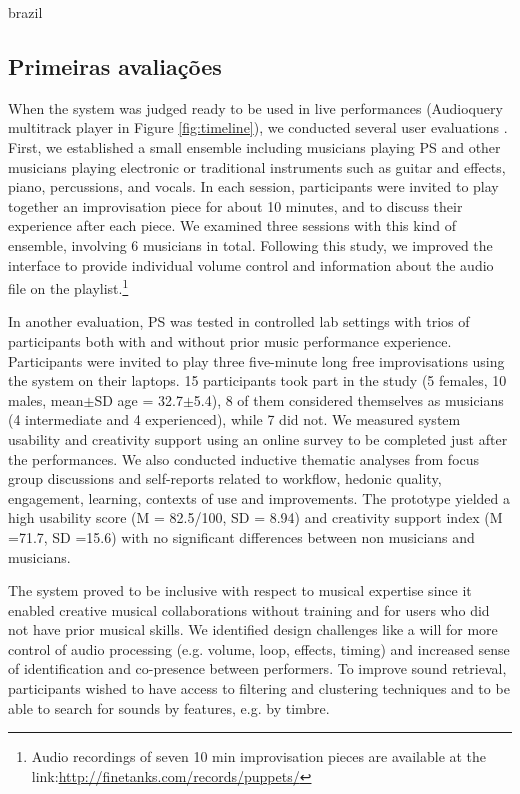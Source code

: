 \begin{otherlanguage*}{brazil}
\subsection{Primeiras avaliações}

When the system was judged ready to be used in live performances (Audioquery multitrack player in Figure \ref{fig:timeline}), we conducted several user evaluations \cite{Stolfi2018b}. First, we established a small ensemble including musicians playing PS and other musicians playing electronic or traditional instruments such as guitar and effects, piano, percussions, and vocals. In each session, participants were invited to play together an improvisation piece for about 10 minutes, and to discuss their experience after each piece. We examined three sessions with this kind of ensemble, involving 6 musicians in total. Following this study, we improved the interface to provide individual volume control and information about the audio file on the playlist.\footnote{Audio recordings of seven 10 min improvisation pieces are available at the link:\url{http://finetanks.com/records/puppets/}}

In another evaluation, PS was tested in controlled lab settings with trios of participants both with and without prior music performance experience. Participants were invited to play three five-minute long free improvisations using the system on their laptops. 15 participants took part in the study (5 females, 10 males, mean$\pm$SD age = 32.7$\pm$5.4), 8 of them considered themselves as musicians (4 intermediate and 4 experienced), while 7 did not. We measured system usability \cite{Jordan1996} and creativity support \cite{Cherry2014} using an online survey to be completed just after the performances. We also conducted inductive thematic analyses \cite{Braun2006} from focus group discussions and self-reports related to workflow, hedonic quality, engagement, learning, contexts of use and improvements. The prototype yielded a high usability score (M = 82.5/100, SD = 8.94) and creativity support index (M =71.7, SD =15.6) with no significant differences between non musicians and musicians.

The system proved to be inclusive with respect to musical expertise since it enabled creative musical collaborations without training and for users who did not have prior musical skills. We identified design challenges like a will for more control of audio processing (e.g. volume, loop, effects, timing) and increased sense of identification and co-presence between performers. To improve sound retrieval, participants wished to have access to filtering and clustering techniques and to be able to search for sounds by features, e.g. by timbre.


\end{otherlanguage*}
